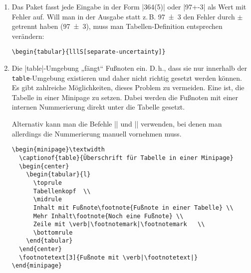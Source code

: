 \begin{enumerate}[label=\alph*)]
\item Das Paket  fasst jede Eingabe in der Form |364(5)| oder |97+-3| als Wert mit Fehler auf. Will man in der Ausgabe statt z.\,B. \num{97(3)} den Fehler durch $\pm$ getrennt haben (\num[separate-uncertainty]{97(3)}), muss man Tabellen-Definition entsprechen verändern:
\begin{lstlisting}
\begin{tabular}{lllS[separate-uncertainty]}
\end{lstlisting}

\pagebreak
\item Die |table|-Um\-ge\-bung „fängt“ Fußnoten ein. D.\,h., dass sie nur innerhalb der \verb|table|-Um\-ge\-bung existieren und daher nicht richtig gesetzt werden können.
Es gibt zahlreiche Möglichkeiten, dieses Problem zu vermeiden. Eine ist, die Tabelle in einer Minipage zu setzen. Dabei werden die Fußnoten mit einer internen Nummerierung direkt unter die Tabelle gesetzt.

Alternativ kann man die Befehle |\footnotemark| und |\footnotetext| verwenden, bei denen man allerdings die Nummerierung manuell vornehmen muss.
\begin{lstlisting}
\begin{minipage}\textwidth
  \captionof{table}{Überschrift für Tabelle in einer Minipage}
  \begin{center}
    \begin{tabular}{l}
      \toprule
      Tabellenkopf	\\
      \midrule
      Inhalt mit Fußnote\footnote{Fußnote in einer Tabelle} \\
      Mehr Inhalt\footnote{Noch eine Fußnote} \\
      Zeile mit \verb|\footnotemark|\footnotemark	\\
      \bottomrule
    \end{tabular}
  \end{center}
  \footnotetext[3]{Fußnote mit \verb|\footnotetext|}
\end{minipage}
\end{lstlisting}

\end{enumerate}
